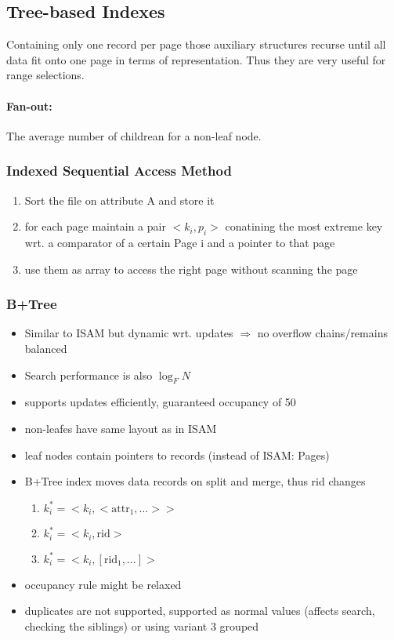 \documentclass[a4paper]{article}
\begin{document}
\begin{twocolumn}
 \subsection{Tree-based Indexes}
Containing only one record per page those auxiliary structures recurse until all data fit onto one page in terms of representation.  Thus they are very useful for range selections. \\

\paragraph{Fan-out:} The average number of childrean for a non-leaf node.

\subsubsection{Indexed Sequential Access Method}

\begin{enumerate}
	\item Sort the file on attribute A and store it
	\item for each page maintain a pair $<k_i,p_i>$ conatining the most extreme key wrt. a comparator of a certain Page i and a pointer to that page
	\item use them as array to access the right page without scanning the page
\end{enumerate}
\subsubsection{B+Tree}
\begin{itemize}
	\item Similar to ISAM but dynamic wrt. updates $\Rightarrow$ no overflow chains/remains balanced
	\item Search performance is also $\log_F N$
	\item supports updates efficiently, guaranteed occupancy of 50%
	\item non-leafes have same layout as in ISAM
	\item leaf nodes contain pointers to records (instead of ISAM: Pages)
	\item B+Tree index moves data records on split and merge, thus rid changes
	\begin{enumerate}
		\item $k_i^* = <k_i,<\text{attr}_1, \dots>>$
		\item $k_i^* = <k_i, \text{rid}>$
		\item $k_i^* = <k_i, [\text{rid}_1, \dots]>$
	\end{enumerate}
	\item occupancy rule might be relaxed
	\item duplicates are not supported, supported as normal values (affects search, checking the siblings) or using variant 3 grouped
\end{itemize}


\end{twocolumn}
\end{document}
